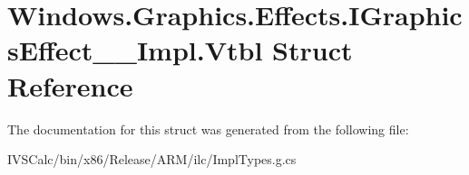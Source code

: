 \hypertarget{struct_windows_1_1_graphics_1_1_effects_1_1_i_graphics_effect_____impl_1_1_vtbl}{}\section{Windows.\+Graphics.\+Effects.\+I\+Graphics\+Effect\+\_\+\+\_\+\+Impl.\+Vtbl Struct Reference}
\label{struct_windows_1_1_graphics_1_1_effects_1_1_i_graphics_effect_____impl_1_1_vtbl}


The documentation for this struct was generated from the following file\+:\begin{DoxyCompactItemize}
\item 
I\+V\+S\+Calc/bin/x86/\+Release/\+A\+R\+M/ilc/Impl\+Types.\+g.\+cs\end{DoxyCompactItemize}
